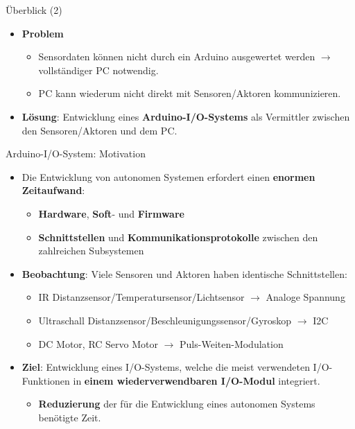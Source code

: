 \documentclass{beamer}
\begin{document}
\begin{frame}{\"Uberblick (2)}
\begin{itemize}
	\item \textbf{Problem}
	\begin{itemize}
		\item Sensordaten k\"onnen nicht durch ein Arduino ausgewertet werden $\rightarrow$ vollst\"andiger PC notwendig.
		\item PC kann wiederum nicht direkt mit Sensoren/Aktoren kommunizieren.
	\end{itemize}
\end{itemize}
\begin{itemize}
	\item \textbf{L\"osung}: Entwicklung eines \textbf{Arduino-I/O-Systems} als Vermittler zwischen den Sensoren/Aktoren und dem PC.
\end{itemize}
\end{frame}
\begin{frame}{Arduino-I/O-System: Motivation}
	\begin{itemize}
		\item Die Entwicklung von autonomen Systemen erfordert einen \textbf{enormen Zeitaufwand}:
		\begin{itemize}
			\item \textbf{Hardware}, \textbf{Soft}- und \textbf{Firmware}
			\item \textbf{Schnittstellen} und \textbf{Kommunikationsprotokolle} zwischen den zahlreichen Subsystemen
		\end{itemize}
	\end{itemize}
	\begin{itemize}
		\item \textbf{Beobachtung}: Viele Sensoren und Aktoren haben identische Schnittstellen:
		\begin{itemize}
			\item IR Distanzsensor/Temperatursensor/Lichtsensor  $\rightarrow$ Analoge Spannung
			\item Ultraschall Distanzsensor/Beschleunigungssensor/Gyroskop $\rightarrow$ I2C
			\item DC Motor, RC Servo Motor $\rightarrow$ Puls-Weiten-Modulation
		\end{itemize}
	\end{itemize}
	\begin{itemize}
		\item \textbf{Ziel}: Entwicklung eines I/O-Systems, welche die meist verwendeten I/O-Funktionen in \textbf{einem wiederverwendbaren I/O-Modul} integriert.
		\begin{itemize}
			\item \textbf{Reduzierung} der f\"ur die Entwicklung eines autonomen Systems ben\"otigte Zeit.
		\end{itemize}
	\end{itemize}
\end{frame}
\end{document}
